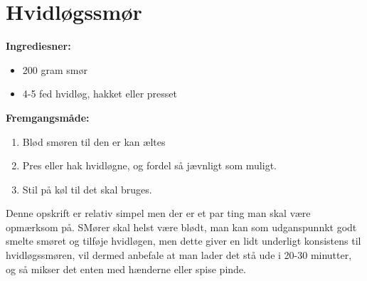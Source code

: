 \documentclass{book}
\begin{document}
\newpage \section{Hvidløgssmør}
\begin{minipage}[t]{0.5\textwidth}
\textbf{Ingrediesner:}
\begin{itemize}
    \item 200 gram smør
    \item 4-5 fed hvidløg, hakket eller presset
\end{itemize}
\end{minipage}
\begin{minipage}[t]{0.5\textwidth}
\textbf{Fremgangsmåde:}
\begin{enumerate}
    \item Blød smøren til den er kan æltes
    \item Pres eller hak hvidløgne, og fordel så jævnligt  som muligt.
    \item Stil på køl til det skal bruges.
\end{enumerate}
\end{minipage}
Denne opskrift er relativ simpel men der er et par ting man skal være opmærksom på. SMører skal helst være blødt, man kan som udganspunnkt godt smelte smøret og tilføje hvidløgen, men dette giver en lidt underligt konsistens til hvidløgssmøren, vil dermed anbefale at man lader det stå ude i 20-30 minutter, og så mikser det enten med hænderne eller spise pinde. 
\end{document}
